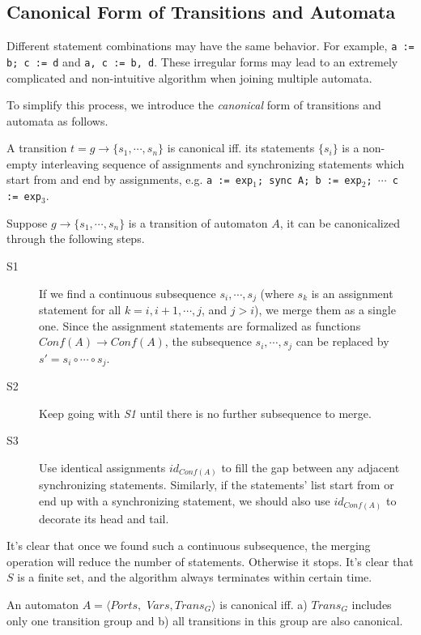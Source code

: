 \subsection{Canonical Form of Transitions and Automata}
\label{subsec:canonical}

Different statement combinations may have the same behavior. For example, \texttt{a := b; c := d} and \texttt{a, c := b, d}. These irregular forms may lead to an extremely complicated and non-intuitive algorithm when joining multiple automata. 

To simplify this process, we introduce the \emph{canonical} form of transitions and automata as follows.

\begin{definition}
A transition $t=g\rightarrow\{s_1,\cdots,s_n\}$ is canonical iff. its statements $\{s_i\}$ is a non-empty interleaving sequence of assignments and synchronizing statements which start from and end by assignments, e.g. \texttt{a := exp$_1$; sync A; b := exp$_2$; $\cdots$ \texttt{c := exp$_3$}}.
\end{definition}

Suppose $g\rightarrow\{s_1,\cdots,s_n\}$ is a transition of automaton $A$, it can be canonicalized through the following steps.
\begin{description}
    \item[S1] If we find a continuous subsequence $s_i,\cdots,s_j$ (where $s_k$ is an assignment statement for all $k= i,i+1,\cdots,j$, and $j>i$), we merge them as a single one. Since the assignment statements are formalized as functions $Conf(A)\rightarrow Conf(A)$, the subsequence $s_i,\cdots, s_j$ can be replaced by $s'=s_i\circ\cdots \circ s_j$.
    \item[S2] Keep going with \emph{S1} until there is no further subsequence to merge.
    \item[S3] Use identical assignments $id_{Conf(A)}$ to fill the gap between any adjacent synchronizing statements. Similarly, if the statements' list start from or end up with a synchronizing statement, we should also use $id_{Conf(A)}$ to decorate its head and tail.
\end{description}

It's clear that once we found such a continuous subsequence, the merging operation will reduce the number of statements. Otherwise it stops. It's clear that $S$ is a finite set, and the algorithm always terminates within certain time.

\begin{definition}
    An automaton $A=\langle Ports,$ $Vars,Trans_G\rangle$ is canonical iff. a) $Trans_G$ includes only one transition group and b) all transitions in this group are also canonical.
\end{definition}


